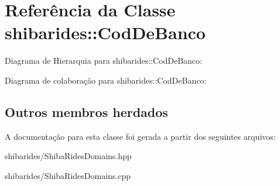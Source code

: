 \hypertarget{classshibarides_1_1CodDeBanco}{}\section{Referência da Classe shibarides\+:\+:Cod\+De\+Banco}
\label{classshibarides_1_1CodDeBanco}


Diagrama de Hierarquia para shibarides\+:\+:Cod\+De\+Banco\+:


Diagrama de colaboração para shibarides\+:\+:Cod\+De\+Banco\+:
\subsection*{Outros membros herdados}


A documentação para esta classe foi gerada a partir dos seguintes arquivos\+:\begin{DoxyCompactItemize}
\item 
shibarides/Shiba\+Rides\+Domains.\+hpp\item 
shibarides/Shiba\+Rides\+Domains.\+cpp\end{DoxyCompactItemize}
